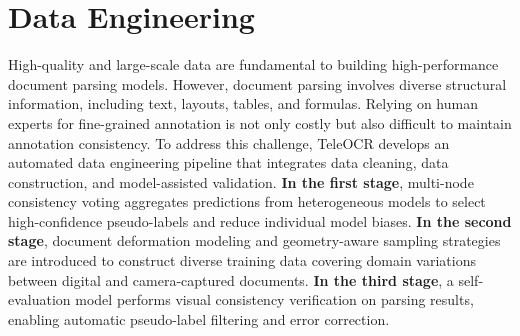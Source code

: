 \documentclass{fairmeta}
\begin{document}
\section{Data Engineering}
\label{sec:Data_Engineering}
High-quality and large-scale data are fundamental to building high-performance document parsing models. However, document parsing involves diverse structural information, including text, layouts, tables, and formulas. Relying on human experts for fine-grained annotation is not only costly but also difficult to maintain annotation consistency. To address this challenge, TeleOCR develops an automated data engineering pipeline that integrates data cleaning, data construction, and model-assisted validation. \textbf{In the first stage}, multi-node consistency voting aggregates predictions from heterogeneous models to select high-confidence pseudo-labels and reduce individual model biases. \textbf{In the second stage}, document deformation modeling and geometry-aware sampling strategies are introduced to construct diverse training data covering domain variations between digital and camera-captured documents. \textbf{In the third stage}, a self-evaluation model performs visual consistency verification on parsing results, enabling automatic pseudo-label filtering and error correction.

\end{document}
